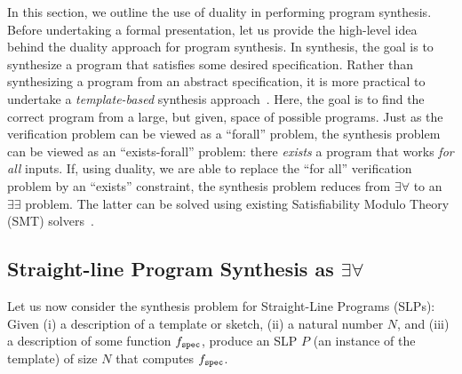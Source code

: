 \documentclass[preprint]{sig-alternate-05-2015}
\def\spec{{\tt{spec}}}
\begin{document}
In this section, we outline the use of duality in performing
program synthesis.
%
Before undertaking a formal presentation, let us provide the
high-level idea behind the duality approach for program synthesis.
In synthesis, the goal is to synthesize a program that satisfies
some desired specification. Rather than synthesizing a program from an abstract specification,
it is more practical to undertake a {\em template-based\/} synthesis
approach~\cite{DBLP:conf/fmcad/AlurBJMRSSSTU13,Solar05,Solar06,bitvector}.
Here, the goal is to find the correct program from a large, but given,
space of possible programs.
Just as the verification problem can be viewed as a
``forall'' problem, the synthesis problem can be viewed as an
``exists-forall'' problem: there {\em{exists}} a program that works
{\em{for all}} inputs.
If, using duality, we are able to replace the ``for all'' verification
problem by an ``exists'' constraint, the synthesis problem reduces
from $\exists\forall$ to an $\exists\exists$ problem.
The latter can be solved using existing Satisfiability Modulo Theory (SMT)
solvers~\cite{yices,z3}.

\subsection{Straight-line Program Synthesis as $\exists\forall$}

Let us now consider the synthesis problem for Straight-Line Programs (SLPs):
Given (i) a description of a template or sketch, 
(ii) a natural number $N$, and (iii) a description of some function $f_\spec$, produce
an SLP $P$ (an instance of the template) of size $N$ that
computes $f_\spec$.
\end{document}
